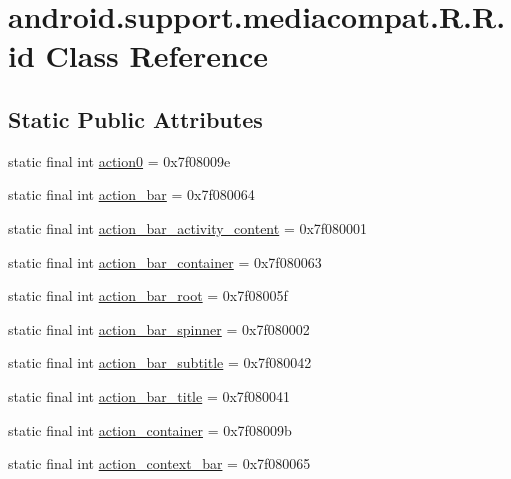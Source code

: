 \hypertarget{classandroid_1_1support_1_1mediacompat_1_1_r_1_1id}{
\section{android.support.mediacompat.R.R.id Class Reference}
\label{classandroid_1_1support_1_1mediacompat_1_1_r_1_1id}
}
\subsection*{Static Public Attributes}
\begin{CompactItemize}
\item 
static final int \hyperlink{classandroid_1_1support_1_1mediacompat_1_1_r_1_1id_5a33f4d66715d1f25e4410d5ae1dbba4}{action0} = 0x7f08009e
\item 
static final int \hyperlink{classandroid_1_1support_1_1mediacompat_1_1_r_1_1id_c7661e9f9c05fa70dc00833658ba6e44}{action\_\-bar} = 0x7f080064
\item 
static final int \hyperlink{classandroid_1_1support_1_1mediacompat_1_1_r_1_1id_436f491462dce3fc4d38df521b151b0c}{action\_\-bar\_\-activity\_\-content} = 0x7f080001
\item 
static final int \hyperlink{classandroid_1_1support_1_1mediacompat_1_1_r_1_1id_d707c3e1a2c8a7e8a0aed98a4562c556}{action\_\-bar\_\-container} = 0x7f080063
\item 
static final int \hyperlink{classandroid_1_1support_1_1mediacompat_1_1_r_1_1id_8d5f25857eeafe439954a621128973cb}{action\_\-bar\_\-root} = 0x7f08005f
\item 
static final int \hyperlink{classandroid_1_1support_1_1mediacompat_1_1_r_1_1id_b4e228862bb808cd9a6d310103a26d4d}{action\_\-bar\_\-spinner} = 0x7f080002
\item 
static final int \hyperlink{classandroid_1_1support_1_1mediacompat_1_1_r_1_1id_a7b96e49383349c2972a4f221b4f71f8}{action\_\-bar\_\-subtitle} = 0x7f080042
\item 
static final int \hyperlink{classandroid_1_1support_1_1mediacompat_1_1_r_1_1id_b35c180106340185a3d3d0e559b11649}{action\_\-bar\_\-title} = 0x7f080041
\item 
static final int \hyperlink{classandroid_1_1support_1_1mediacompat_1_1_r_1_1id_fab687462ff73969b6fefe2cd61d1f52}{action\_\-container} = 0x7f08009b
\item 
static final int \hyperlink{classandroid_1_1support_1_1mediacompat_1_1_r_1_1id_44d9073467a6e20d0393fe1afcc7bf7e}{action\_\-context\_\-bar} = 0x7f080065

\end{CompactItemize}
